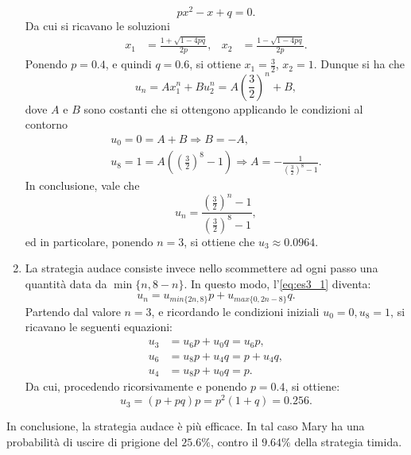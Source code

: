 \documentclass[
	12pt, %
]{fphw}
\begin{document}
\begin{enumerate}
\begin{equation*}
			px^2 - x + q = 0.
		\end{equation*}
		Da cui si ricavano le soluzioni
		\begin{align*}
			x_1 &= \frac{1 + \sqrt{1 - 4pq}}{2p}, & x_2 &= \frac{1 - \sqrt{1 - 4pq}}{2p}.
		\end{align*}
		Ponendo $p = 0.4$, e quindi $q = 0.6$, si ottiene $x_1 = \frac{3}{2}$, $x_2 = 1$.
		Dunque si ha che
		\begin{equation*}
			u_n = Ax_1^n + Bu_2^n = A\left( \frac{3}{2} \right)^n + B,
		\end{equation*}
		dove $A$ e $B$ sono costanti che si ottengono applicando le condizioni al contorno
		\begin{equation*}
			\begin{gathered}
				u_0 = 0 = A + B \Rightarrow  B = -A, \\
				u_8 = 1 = A\left( \left( \frac{3}{2} \right)^8 - 1 \right) \Rightarrow A = - \frac{1}{\left( \frac{3}{2} \right)^8 - 1}.
			\end{gathered}
		\end{equation*}
		In conclusione, vale che
		\begin{equation*}
			u_n = \frac{\left( \frac{3}{2} \right)^n - 1}{\left( \frac{3}{2} \right)^8 - 1},
		\end{equation*}
		ed in particolare, ponendo $n = 3$, si ottiene che $u_3 \approx 0.0964$.
	
	\item La strategia audace consiste invece nello scommettere ad ogni passo una quantità data da $\min\{n, 8-n\}$.
		In questo modo, l'\autoref{eq:es3_1} diventa:
		\begin{equation*}
			u_n = u_{min\{2n, 8\}}p + u_{max\{0, 2n-8\}}q.
		\end{equation*}
		Partendo dal valore $n = 3$, e ricordando le condizioni iniziali $u_0 = 0, u_8 = 1$, si ricavano le seguenti equazioni:
		\begin{equation*}
			\begin{aligned}
				u_3 &= u_6p + u_0q = u_6p,	\\
				u_6 &= u_8p + u_4q = p + u_4q,	\\
				u_4 &= u_8p + u_0q = p.				
			\end{aligned}
		\end{equation*}
		Da cui, procedendo ricorsivamente e ponendo $p = 0.4$, si ottiene:
		\begin{equation*}
			u_3 = (p + pq)p = p^2(1 + q) = 0.256.
		\end{equation*}
\end{enumerate}
In conclusione, la strategia audace è più efficace.
In tal caso Mary ha una probabilità di uscire di prigione del $25.6\%$, contro il $9.64\%$ della strategia timida.
\end{document}
